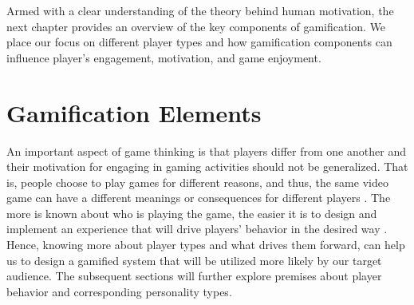 Armed with a clear understanding of the theory behind human motivation, the next chapter provides an overview of the key components of gamification. We place our focus on different player types and how gamification components can influence player's engagement, motivation, and game enjoyment. %
\chapter{Gamification Elements}
An important aspect of game thinking is that players differ from one another and their motivation for engaging in gaming activities should not be generalized. That is, people choose to play games for different reasons, and thus, the same video game can have a different meanings or consequences for different players \cite{yee2006motivations}. The more is known about who is playing the game, the easier it is to design and implement an experience that will drive players' behavior in the desired way \cite{zichermann2011gamification}. Hence, knowing more about player types and what drives them forward, can help us to design a gamified system that will be utilized more likely by our target audience. The subsequent sections will further explore premises about player behavior and corresponding personality types.
